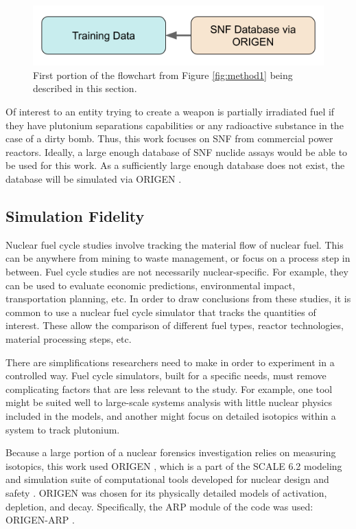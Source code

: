 \begin{figure}[H]
  \centering
  \includegraphics[width=0.7\linewidth]{./chapters/exp1/methodology1_1.png}
  \caption[First portion of the flowchart from Figure \ref{fig:method1}]
          {First portion of the flowchart from Figure \ref{fig:method1} being 
           described in this section.}
\end{figure}

Of interest to an entity trying to create a weapon is partially irradiated fuel
if they have plutonium separations capabilities or any radioactive substance in
the case of a dirty bomb. Thus, this work focuses on \gls{SNF} from commercial
power reactors. Ideally, a large enough database of \gls{SNF} nuclide assays
would be able to be used for this work. As a sufficiently large enough database
does not exist, the database will be simulated via \gls{ORIGEN} \cite{origen,
origenarp}.  

\subsection{Simulation Fidelity}
\label{sec:fidelity}

Nuclear fuel cycle studies involve tracking the material flow of nuclear fuel.
This can be anywhere from mining to waste management, or focus on a process
step in between. Fuel cycle studies are not necessarily nuclear-specific. For
example, they can be used to evaluate economic predictions, environmental
impact, transportation planning, etc.  In order to draw conclusions from these
studies, it is common to use a nuclear fuel cycle simulator that tracks the
quantities of interest. These allow the comparison of different fuel types,
reactor technologies, material processing steps, etc. 

There are simplifications researchers need to make in order to experiment in a
controlled way. Fuel cycle simulators, built for a specific needs, must remove
complicating factors that are less relevant to the study.  For example, one
tool might be suited well to large-scale systems analysis with little nuclear
physics included in the models, and another might focus on detailed isotopics
within a system to track plutonium.

Because a large portion of a nuclear forensics investigation relies on
measuring isotopics, this work used \gls{ORIGEN} \cite{origen}, which is a part
of the \gls{SCALE} 6.2 modeling and simulation suite of computational tools
developed for nuclear design and safety \cite{scale}. \gls{ORIGEN} was chosen
for its physically detailed models of activation, depletion, and decay.
Specifically, the ARP module of the code was used: \gls{ORIGEN-ARP}
\cite{origenarp}.

